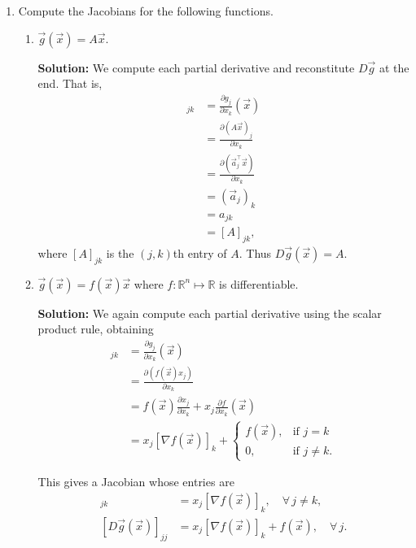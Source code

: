 \documentclass[10pt]{article}
\theoremstyle{definition}
\theoremstyle{plain}
\newcommand{\RR}{\mathbb{R}}
\begin{document}
\begin{enumerate}[label=(\alph*)]
\item Compute the Jacobians for the following functions.
\begin{enumerate}[label=\roman*.]
    \item $\vec{g}(\vec{x}) = A\vec{x}$.

    \textbf{Solution:} We compute each partial derivative and reconstitute $D\vec{g}$ at the end. That is,
    \begin{align}
    [D\vec{g}(\vec{x})]_{jk} &= \frac{\partial g_j}{\partial x_k}(\vec{x}) \\
    &= \frac{\partial (A\vec{x})_j}{\partial x_k} \\
    &= \frac{\partial (\vec{a}_j^\top \vec{x})}{\partial x_k} \\
    &= (\vec{a}_j)_k \\
    &= a_{jk} \\
    &= [A]_{jk},
    \end{align}
    where $[A]_{jk}$ is the $(j,k)$th entry of $A$. Thus $D\vec{g}(\vec{x}) = A$.

    \item $\vec{g}(\vec{x}) = f(\vec{x})\vec{x}$ where $f : \RR^n \mapsto \RR$ is differentiable.

    \textbf{Solution:} We again compute each partial derivative using the scalar product rule, obtaining
    \begin{align}
    [D\vec{g}(\vec{x})]_{jk} &= \frac{\partial g_j}{\partial x_k}(\vec{x}) \\
    &= \frac{\partial (f(\vec{x}) x_j)}{\partial x_k} \\
    &= f(\vec{x})\frac{\partial x_j}{\partial x_k} + x_j \frac{\partial f}{\partial x_k}(\vec{x}) \\
    &= x_j [\nabla f(\vec{x})]_k + \begin{cases} f(\vec{x}), & \text{if } j = k \\ 0, & \text{if } j \neq k. \end{cases}
    \end{align}

    This gives a Jacobian whose entries are
    \begin{align}
    [D\vec{g}(\vec{x})]_{jk} &= x_j [\nabla f(\vec{x})]_k, \quad \forall\, j \neq k, \\
    [D\vec{g}(\vec{x})]_{jj} &= x_j [\nabla f(\vec{x})]_k + f(\vec{x}), \quad \forall\, j.
    \end{align}


\end{enumerate}
\end{enumerate}
\end{document}
